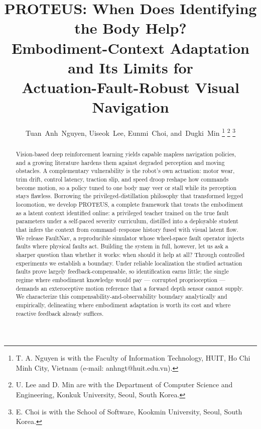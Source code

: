 \documentclass[journal]{IEEEtran}
\begin{document}
\title{PROTEUS: When Does Identifying the Body Help?\\
Embodiment-Context Adaptation and Its Limits for\\
Actuation-Fault-Robust Visual Navigation}

\author{Tuan~Anh~Nguyen,
        Uiseok~Lee,
        Eunmi~Choi,
        and~Dugki~Min%
\thanks{T. A. Nguyen is with the Faculty of Information Technology, HUIT,
Ho Chi Minh City, Vietnam (e-mail: anhngt@huit.edu.vn).}%
\thanks{U. Lee and D. Min are with the Department of Computer Science and
Engineering, Konkuk University, Seoul, South Korea.}%
\thanks{E. Choi is with the School of Software, Kookmin University, Seoul,
South Korea.}}


\maketitle

\begin{abstract}
Vision-based deep reinforcement learning yields capable mapless navigation
policies, and a growing literature hardens them against degraded perception
and moving obstacles. A complementary vulnerability is the robot's own
actuation: motor wear, trim drift, control latency, traction slip, and speed
droop reshape how commands become motion, so a policy tuned to one body may
veer or stall while its perception stays flawless. Borrowing the
privileged-distillation philosophy that transformed legged locomotion, we
develop PROTEUS, a complete framework that treats the embodiment as a latent
context identified online: a privileged teacher trained on the true fault
parameters under a self-paced severity curriculum, distilled into a deployable
student that infers the context from command--response history fused with
visual latent flow. We release FaultNav, a reproducible simulator whose
wheel-space fault operator injects faults where physical faults act. Building
the system in full, however, let us ask a sharper question than whether it
works: when should it help at all? Through controlled experiments we establish
a boundary. Under reliable localization the studied actuation faults prove
largely feedback-compensable, so identification earns little; the single
regime where embodiment knowledge would pay --- corrupted proprioception ---
demands an exteroceptive motion reference that a forward depth sensor cannot
supply. We characterize this compensability-and-observability boundary
analytically and empirically, delineating where embodiment adaptation is worth
its cost and where reactive feedback already suffices.
\end{abstract}
\end{document}
